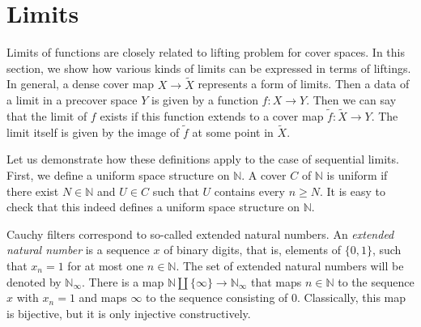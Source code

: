 \documentclass[reqno]{amsart}
\theoremstyle{definition}
\theoremstyle{remark}
\numberwithin{figure}{section}
\begin{document}
\section{Limits}
\label{sec:limits}

Limits of functions are closely related to lifting problem for cover spaces.
In this section, we show how various kinds of limits can be expressed in terms of liftings.
In general, a dense cover map $X \to \widetilde{X}$ represents a form of limits.
Then a data of a limit in a precover space $Y$ is given by a function $f : X \to Y$.
Then we can say that the limit of $f$ exists if this function extends to a cover map $\widetilde{f} : \widetilde{X} \to Y$.
The limit itself is given by the image of $\widetilde{f}$ at some point in $\widetilde{X}$.

Let us demonstrate how these definitions apply to the case of sequential limits.
First, we define a uniform space structure on $\mathbb{N}$.
A cover $C$ of $\mathbb{N}$ is uniform if there exist $N \in \mathbb{N}$ and $U \in C$ such that $U$ contains every $n \geq N$.
It is easy to check that this indeed defines a uniform space structure on $\mathbb{N}$.

Cauchy filters correspond to so-called extended natural numbers.
An \emph{extended natural number} is a sequence $x$ of binary digits, that is, elements of $\{ 0, 1 \}$, such that $x_n = 1$ for at most one $n \in \mathbb{N}$.
The set of extended natural numbers will be denoted by $\mathbb{N}_\infty$.
There is a map $\mathbb{N} \amalg \{ \infty \} \to \mathbb{N}_\infty$ that maps $n \in \mathbb{N}$ to the sequence $x$ with $x_n = 1$ and maps $\infty$ to the sequence consisting of $0$.
Classically, this map is bijective, but it is only injective constructively.
\end{document}
